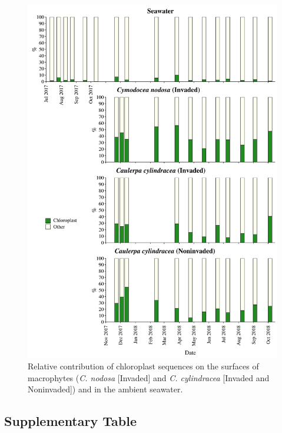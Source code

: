 \documentclass[12pt,]{article}
\begin{document}
\begin{figure}[H]

{\centering \includegraphics[width=0.85\linewidth]{../results/figures/chloroplast_bar_plot} 

}

\caption{Relative contribution of chloroplast sequences on the surfaces of macrophytes (\textit{C. nodosa} [Invaded] and \textit{C. cylindracea} [Invaded and Noninvaded]) and in the ambient seawater.\label{chloroplast}}\label{fig:unnamed-chunk-3}
\end{figure}

\hypertarget{supplementary-table}{%
\subsection{Supplementary Table}\label{supplementary-table}}

\begingroup\fontsize{9}{11}\selectfont
\end{document}
